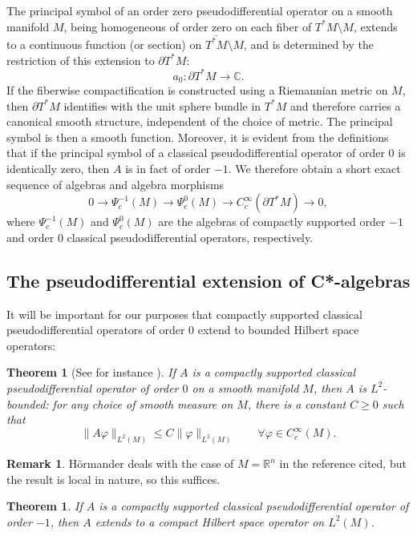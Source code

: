 \documentclass[leqno,11pt]{amsart}
\numberwithin{equation}{subsection}
\theoremstyle{plain}
\newtheorem{theorem}[equation]{Theorem}
\theoremstyle{definition}
\newtheorem{remark}[equation]{Remark}
\theoremstyle{remark}
\newcommand{\R}{\mathbb{R}}
\newcommand{\C}{\mathbb{C}}
\begin{document}
The  principal symbol  of an order zero pseudodifferential operator on a smooth manifold $M$, being homogeneous of order zero on each fiber of $T^*M\setminus M$, extends to a continuous function (or section)  on $\overline{T^*M}   \setminus M$, and is determined by the restriction of this extension to $\partial T^*M$:
\[
a_0 \colon  \partial T^*M  \longrightarrow \C .
\]
If the fiberwise compactification is constructed using a Riemannian metric on $M$, then $\partial T^*M$ identifies with the unit sphere bundle in $T^*M$ and therefore carries a canonical smooth structure, independent of the choice of metric. 
The principal symbol is then a smooth function. Moreover, it is evident from the definitions that if the principal symbol of a  classical pseudodifferential operator of order $0$ is identically zero, then $ A$ is in fact of order ${-}1$. We therefore obtain a short exact sequence of algebras and algebra morphisms
 \[
0 \longrightarrow \Psi^{-1}_c (M) \longrightarrow  \Psi^0_c(M) \longrightarrow 
C^\infty _c(\partial T^*M)
\longrightarrow 0 ,
\]
where $\Psi_c^{-1}(M)$ and $\Psi^0_c(M)$ are the algebras of compactly supported order $-1$ and order $0$ classical pseudodifferential operators, respectively.

\subsection{The pseudodifferential extension of C*-algebras}

It will be important for our purposes that compactly supported   classical pseudodifferential operators of order $0$ extend to  bounded Hilbert space operators: 

\begin{theorem}[See for instance {\cite[Thm.\ 18.1.1]{HormanderVolIII}}]
\label{thm-l-2-boundedness-of-order-zero-psdo}
If $A$ is a compactly supported   classical pseudodifferential operator of order $0$ on a smooth manifold $M$, then $A$ is $L^2$-bounded:  for any choice of smooth measure on $M$, there is a constant $C\ge 0$ such that 
\[
\| A \varphi  \|_{L^2(M)} \le  C \| \varphi \|_{L^2(M)} \qquad \forall \varphi \in C_c^\infty (M).
\]
\end{theorem}

\begin{remark} 
H\"ormander deals with the case of $M{=}\R^n$ in the reference cited, but the result is  local in nature, so this suffices.
\end{remark}

\begin{theorem}
\label{thm-negative-order-operators-compact}
  If $A$ is a compactly supported   classical pseudodifferential operator of order $-1$, then $A$ extends to  a compact Hilbert space operator on $L^2 (M)$.
\end{theorem}
\end{document}
